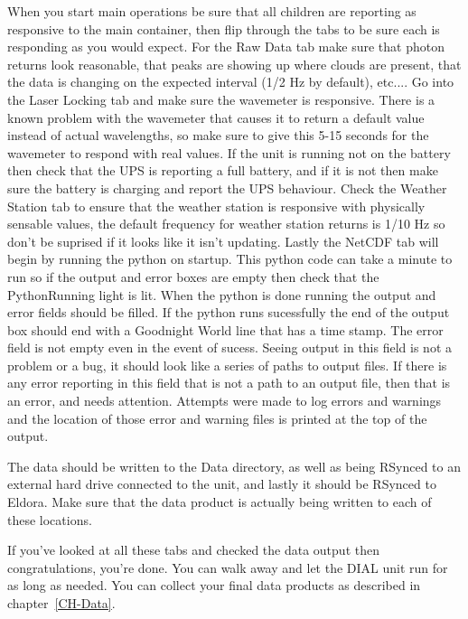 When you start main operations be sure that all children are reporting as responsive to the main container, then flip through the tabs to be sure each is responding as you would expect. For the Raw Data tab make sure that photon returns look reasonable, that peaks are showing up where clouds are present, that the data is changing on the expected interval (1/2 Hz by default), etc.... Go into the Laser Locking tab and make sure the wavemeter is responsive. There is a known problem with the wavemeter that causes it to return a default value instead of actual wavelengths, so make sure to give this 5-15 seconds for the wavemeter to respond with real values. If the unit is running not on the battery then check that the UPS is reporting a full battery, and if it is not then make sure the battery is charging and report the UPS behaviour. Check the Weather Station tab to ensure that the weather station is responsive with physically sensable values, the default frequency for weather station returns is 1/10 Hz so don't be suprised if it looks like it isn't updating. Lastly the NetCDF tab will begin by running the python on startup. This python code can take a minute to run so if the output and error boxes are empty then check that the PythonRunning light is lit. When the python is done running the output and error fields should be filled. If the python runs sucessfully the end of the output box should end with a Goodnight World line that has a time stamp. The error field is not empty even in the event of sucess. Seeing output in this field is not a problem or a bug, it should look like a series of paths to output files. If there is any error reporting in this field that is not a path to an output file, then that is an error, and needs attention. Attempts were made to log errors and warnings and the location of those error and warning files is printed at the top of the output. 

The data should be written to the Data directory, as well as being RSynced to an external hard drive connected to the unit, and lastly it should be RSynced to Eldora. Make sure that the data product is actually being written to each of these locations. 

If you've looked at all these tabs and checked the data output then congratulations, you're done. You can walk away and let the DIAL unit run for as long as needed. You can collect your final data products as described in chapter~\ref{CH-Data}.

